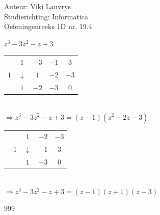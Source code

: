 \documentclass[a4paper]{article}
\begin{document}
  
\noindent \large Auteur: Viki Lauvrys        \\
\noindent \large Studierichting: Informatica \\
\noindent \large Oefeningenreeks 1D nr. 19.4 \\

\medskip

\normalsize

$ z^3 -3z^2 -z +3 $ \\

\begin{tabular} {c|cccc} 
                  & $1$          & $-3$ & $-1$                      & $3$  \\      
  $1$  						& $\downarrow$ & $1$  & $-2$                      & $-3$ \\ \hline            
	                & $1$          & $-2$ & \multicolumn{1}{c|}{$-3$} & $0$ 
\end{tabular} \\

$ \Rightarrow z^3 -3z^2 -z +3 = (z-1)(z^2 -2z -3) $ \\

\begin{tabular} {c|ccc} 
                  & $1$          & $-2$           & $-3$  \\      
  $-1$  					& $\downarrow$ & $-1$           & $3$   \\ \hline            
	                & $1$ & \multicolumn{1}{c|}{$-3$} & $0$ 
\end{tabular} \\

$ \Rightarrow z^3 -3z^2 -z +3 = (z-1)(z+1)(z-3) $ \\

\begin{thebibliography}{999}
\end{thebibliography}
\end{document}
